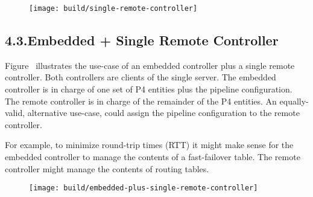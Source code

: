 \documentclass[11pt]{article}
\begin{document}
{%
\begin{figure}[tbp]%
\begin{mdcenter}%

\noindent{}\texttt{[image: build/single-remote-controller]}{}%

\mdhr{}%

\noindent{}%
\end{mdcenter}\label{fig-single-remote-controller}%
\end{figure}%

\subsection{4.3.\hspace*{0.5em}Embedded + Single Remote Controller}\label{sec-embedded-single-remote-controller}%

\noindent{}Figure~ illustrates the use-case of
an embedded controller plus a single remote controller. Both controllers are
clients of the single server. The embedded controller is in charge of one set of
P4 entities plus the pipeline configuration. The remote controller is in charge
of the remainder of the P4 entities. An equally-valid, alternative use-case,
could assign the pipeline configuration to the remote controller.%

For example, to minimize round-trip times (RTT) it might make sense for the
embedded controller to manage the contents of a fast-failover table. The remote
controller might manage the contents of routing tables.%

\begin{figure}[tbp]%
\begin{mdcenter}%

\noindent{}\texttt{[image: build/embedded-plus-single-remote-controller]}{}%

\mdhr{}%

\noindent{}%
\end{mdcenter}\label{fig-embedded-plus-single-remote-controller}%
\end{figure}%

}
\end{document}
